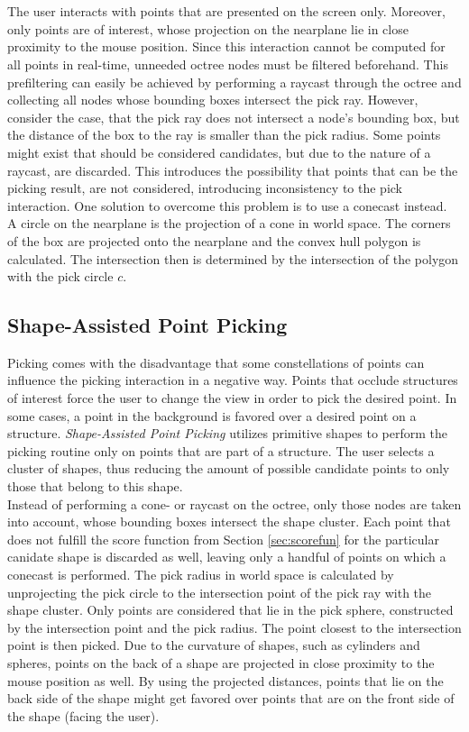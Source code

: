 \\
\\
The user interacts with points that are presented on the screen only. Moreover, only points are of interest, whose projection on the nearplane lie in close proximity to the mouse position. Since this interaction cannot be computed for all points in real-time, unneeded octree nodes must be filtered beforehand. This prefiltering can easily be achieved by performing a raycast through the octree and collecting all nodes whose bounding boxes intersect the pick ray. However, consider the case, that the pick ray does not intersect a node's bounding box, but the distance of the box to the ray is smaller than the pick radius. Some points might exist that should be considered candidates, but due to the nature of a raycast, are discarded. This introduces the possibility that points that can be the picking result, are not considered, introducing inconsistency to the pick interaction. One solution to overcome this problem is to use a conecast instead. 
\\
A circle on the nearplane is the projection of a cone in world space. The corners of the box are projected onto the nearplane and the convex hull polygon is calculated. The intersection then is determined by the intersection of the polygon with the pick circle $c$. 


\subsection{Shape-Assisted Point Picking}
Picking comes with the disadvantage that some constellations of points can influence the picking interaction in a negative way. Points that occlude structures of interest force the user to change the view in order to pick the desired point. In some cases, a point in the background is favored over a desired point on a structure. 
 \textit{Shape-Assisted Point Picking} utilizes primitive shapes to perform the picking routine only on points that are part of a structure. The user selects a cluster of shapes, thus reducing the amount of possible candidate points to only those that belong to this shape. 
\\
Instead of performing a cone- or raycast on the octree, only those nodes are taken into account, whose bounding boxes intersect the shape cluster. Each point that does not fulfill the score function from Section \ref{sec:scorefun} for the particular canidate shape is discarded as well, leaving only a handful of points on which a conecast is performed. The pick radius in world space is calculated by unprojecting the pick circle to the intersection point of the pick ray with the shape cluster. Only points are considered that lie in the pick sphere, constructed by the intersection point and the pick radius. The point closest to the intersection point is then picked. Due to the curvature of shapes, such as cylinders and spheres, points on the back of a shape are projected in close proximity to the mouse position as well. By using the projected distances, points that lie on the back side of the shape might get favored over points that are on the front side of the shape (facing the user). 
\\

